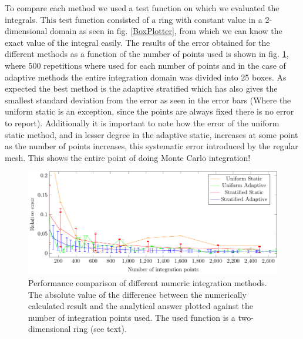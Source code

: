 To compare each method we used a test function on which we evaluated the integrals.
This test function consisted of a ring with constant value in a 2-dimensional domain as seen in fig. \ref{BoxPlotter}, from which
we can know the exact value of the integral easily. The results
of the error obtained for the different methods as a function of the number of points used is shown in fig. \ref{MCerrs},
 where 500 repetitions where used for each number of points and in the case of adaptive methods the entire integration
 domain was divided into 25 boxes. As
expected the best method is the adaptive stratified which has also gives the smallest standard deviation from the error as seen in the error bars (Where
the uniform static is an exception, since the points are always fixed there is no error to report).
Additionally it is important to note how the error of the uniform static method, and in lesser degree in the adaptive static,
 increases at some point as the number of points increases, this systematic error introduced by the regular mesh. This shows the entire point of doing Monte Carlo integration!
\begin{figure}[ht]
  \begin{center}
  \includegraphics[scale=1 ]{graphs/integration_test_ring.pdf}
  \caption{Performance comparison of different numeric integration methods. The absolute value of the difference between the numerically calculated result and the analytical answer plotted against the number of integration points used. The used function is a two-dimensional ring (see text).}
  \label{MCerrs}
  \end{center}
\end{figure}
